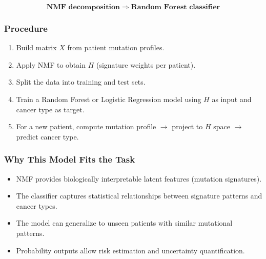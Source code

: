 \[
    \textbf{NMF decomposition} \; \Rightarrow \; \textbf{Random Forest classifier}
\]

\subsubsection*{Procedure}
\begin{enumerate}
    \item Build matrix $X$ from patient mutation profiles.
    \item Apply NMF to obtain $H$ (signature weights per patient).
    \item Split the data into training and test sets.
    \item Train a Random Forest or Logistic Regression model using $H$ as input and cancer type as target.
    \item For a new patient, compute mutation profile $\rightarrow$ project to $H$ space $\rightarrow$ predict cancer type.
\end{enumerate}

\subsubsection*{Why This Model Fits the Task}
\begin{itemize}
    \item NMF provides biologically interpretable latent features (mutation signatures).
    \item The classifier captures statistical relationships between signature patterns and cancer types.
    \item The model can generalize to unseen patients with similar mutational patterns.
    \item Probability outputs allow risk estimation and uncertainty quantification.
\end{itemize}
